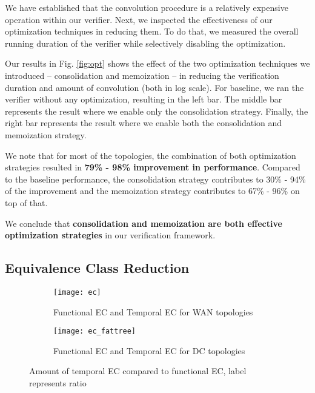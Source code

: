 We have established that the convolution procedure is a relatively expensive operation within 
our verifier.
Next, we inspected the effectiveness of our optimization techniques in reducing them.
To do that, we measured the overall running duration of the verifier while selectively disabling the 
optimization.

Our results in Fig. \ref{fig:opt} shows the effect of the two optimization techniques we introduced -- 
consolidation and memoization -- in reducing the verification duration and amount of convolution (both in log scale).
For baseline, we ran the verifier without any optimization, resulting in the left bar.
The middle bar represents the result where we enable only the consolidation strategy.
Finally, the right bar represents the result where we enable both the consolidation and memoization strategy.

We note that for most of the topologies, the combination of both optimization strategies resulted in 
\textbf{79\% - 98\% improvement in performance}.
Compared to the baseline performance, the consolidation strategy contributes to 30\% - 94\% of the improvement and
the memoization strategy contributes to 67\% - 96\% on top of that. 

We conclude that \textbf{consolidation and memoization are both effective optimization strategies} in our verification
framework.

\subsection{Equivalence Class Reduction}


\begin{figure}[h]
    \centering
    \begin{subfigure}[b]{\columnwidth}
        \centering
        \texttt{[image: ec]}
        \caption{Functional EC and Temporal EC for WAN topologies}
        \label{fig:y equals x}
    \end{subfigure}
    \vfill
    \begin{subfigure}[b]{\columnwidth}
        \centering
        \texttt{[image: ec\_fattree]}
        \caption{Functional EC and Temporal EC for DC topologies}
        \label{fig:three sin x}
    \end{subfigure}
       \caption{Amount of temporal EC compared to functional EC, label represents ratio}
       \label{fig:ec}
\end{figure}

